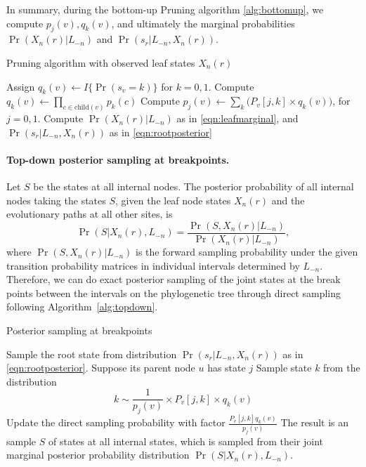 \documentclass[11pt]{article}
\newcommand{\child}[1]{\ensuremath{\mathrm{child}(#1)}}
\begin{document}
In summary, during the bottom-up Pruning algorithm \ref{alg:bottomup}, we compute
$p_j(v), q_k(v)$, and ultimately the marginal probabilities
 $\Pr(X_n(r) | L_{-n})$ and $\Pr(s_r|L_{-n}, X_n(r))$.

\begin{algorithm}[t] 
  \begin{algorithmic}[1]
    \caption{Pruning algorithm with observed leaf states $X_n(r)$}\label{alg:bottomup}
    \STATE Assign $q_k(v) \leftarrow I\{\Pr(s_v = k)\}$ for $k = 0, 1$.
    \ELSE 
    \STATE Compute $q_k(v) \leftarrow \prod_{c\in \child{v}}  p_{k}(c)$
    \ENDIF
    \STATE Compute $p_j(v) \leftarrow \sum\limits_{k} \bigg(P_v[j,k] \times q_k(v)\bigg)$, for $j = 0, 1$.
    \ELSE
    \STATE Compute $\Pr(X_n(r) | L_{-n})$ as in
    \eqref{eqn:leafmarginal}, and $\Pr(s_r| L_{-n}, X_n(r))$ as in
    \eqref{eqn:rootposterior}
    \ENDIF
    \ENDFOR
  \end{algorithmic}
\end{algorithm}


\paragraph{Top-down posterior sampling at breakpoints.}
Let $S$ be the states at all internal nodes. The posterior probability
of all internal nodes taking the states $S$, given the leaf node
states $X_n(r)$ and the evolutionary paths at all other sites, is
\[
\Pr(S | X_n(r), L_{-n}) = \frac{\Pr(S, X_n(r) | L_{-n}) }{\Pr(X_n(r) | L_{-n})},
\]
where $\Pr(S, X_n(r) | L_{-n}) $ is the forward sampling probability
under the given transition probability matrices in individual
intervals determined by $L_{-n}$.
Therefore, we can do exact posterior sampling of the joint states at
the break points between the intervals on the phylogenetic tree through
direct sampling following Algorithm~\ref{alg:topdown}.

\begin{algorithm}[t] 
  \begin{algorithmic}[1]
    \caption{Posterior sampling at breakpoints}\label{alg:topdown}
    \STATE Sample the root state from distribution $\Pr(s_r|L_{-n}, X_n(r))$ as in \eqref{eqn:rootposterior}.
    \STATE Suppose its parent node $u$ has state $j$
    \STATE Sample state $k$ from the distribution 
    \[k \sim \frac{1}{p_j(v)}\times P_v[j,k] \times q_k(v) \]
    \STATE Update the direct sampling probability with factor  $\frac{P_v[j,k]q_k(v)}{p_j(v)}$
    \ENDFOR
    \STATE The result is an sample $S$ of states at all internal states,
  which is sampled from their joint marginal posterior probability
  distribution $\Pr(S| X_n(r), L_{-n}) $.
  \end{algorithmic}
\end{algorithm}
\end{document}

